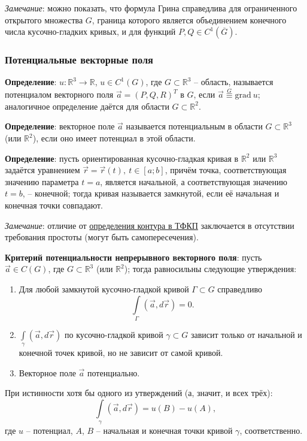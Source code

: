 \documentclass[12pt, a4paper, reqno]{article}
\begin{document}
    \textit{Замечание}: можно показать, что формула Грина справедлива для ограниченного открытого
    множества $G$, граница которого является объединением конечного числа кусочно-гладких кривых, и
    для функций $P, Q \in C^1(\overline{G})$.

    \subsubsection{Потенциальные векторные поля}

    \textbf{Определение}: $u: \mathbb{R}^3 \to \mathbb{R}$, $u \in C^1(G)$, где
    $G \subset \mathbb{R}^3$ -- область, называется потенциалом векторного поля
    $\vec{a} = (P, Q, R)^T$ в $G$, если $\vec{a} \overset{G}{\equiv} \text{grad}\ u$; аналогичное
    определение даётся для области $G \subset \mathbb{R}^2$.

    \textbf{Определение}: векторное поле $\vec{a}$ называется потенциальным в области
    $G \subset \mathbb{R}^3$ (или $\mathbb{R}^2$), если оно имеет потенциал в этой области.

    \textbf{Определение}: пусть ориентированная кусочно-гладкая кривая в $\mathbb{R}^2$ или
    $\mathbb{R}^3$ задаётся уравнением $\vec{r} = \vec{r}(t),\ t \in [a; b]$, причём точка,
    соответствующая значению параметра $t = a$, является начальной, а соответствующая значению
    $t = b$, -- конечной; тогда кривая называется замкнутой, если её начальная и конечная точки
    совпадают.

    \textit{Замечание}: отличие от \hyperlink{complex-circuit}{определения контура в ТФКП} заключается
    в отсутствии требования простоты (могут быть самопересечения).

    \textbf{Критерий потенциальности непрерывного векторного поля}: пусть $\vec{a} \in C(G)$,
    где $G \subset \mathbb{R}^3$ (или $\mathbb{R}^2$); тогда равносильны следующие утверждения:
    \begin{enumerate}
        \item Для любой замкнутой кусочно-гладкой кривой $\Gamma \subset G$ справедливо
            \begin{equation*}
                \int\limits_{\Gamma} (\vec{a}, d\vec{r}) = 0.
            \end{equation*}
        \item $\int\limits_{\gamma} (\vec{a}, d\vec{r})$ по кусочно-гладкой кривой $\gamma \subset G$
              зависит только от начальной и конечной точек кривой, но не зависит от самой кривой.
        \item Векторное поле $\vec{a}$ потенциально.
    \end{enumerate}
    При истинности хотя бы одного из утверждений (а, значит, и всех трёх):
    \begin{equation*}
        \int\limits_{\gamma} (\vec{a}, d\vec{r}) = u(B) - u(A),
    \end{equation*}
    где $u$ -- потенциал, $A$, $B$ -- начальная и конечная точки кривой $\gamma$, соответственно.
\end{document}
